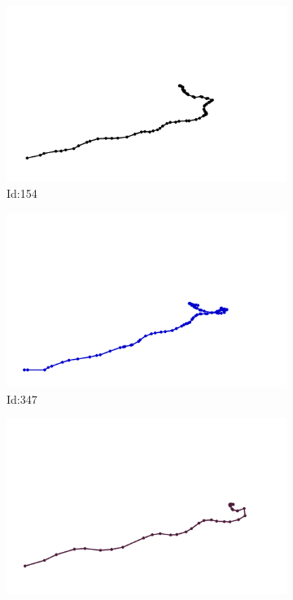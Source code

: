\documentclass[12pt,twoside]{report}
\begin{document}
\begin{figure}
\centering
\begin{subfigure}[b]{0.20\textwidth}
\centering
\includegraphics[width=\textwidth]{../../trajectories/154.png}
\caption{Id:154}
\end{subfigure}
\begin{subfigure}[b]{0.20\textwidth}
\centering
\includegraphics[width=\textwidth]{../../trajectories/347.png}
\caption{Id:347}
\end{subfigure}
\begin{subfigure}[b]{0.20\textwidth}
\centering
\includegraphics[width=\textwidth]{../../trajectories/470.png}

\end{subfigure}
\end{figure}
\end{document}

